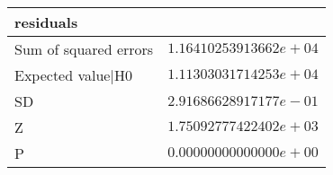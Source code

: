 \begin{table}[!tbp]
\begin{center}
\begin{tabular}{lr}
\hline\hline
\multicolumn{1}{l}{residuals}&\multicolumn{1}{c}{}\tabularnewline
\hline
Sum of squared errors&$1.16410253913662e+04$\tabularnewline
Expected value|H0&$1.11303031714253e+04$\tabularnewline
SD&$2.91686628917177e-01$\tabularnewline
Z&$1.75092777422402e+03$\tabularnewline
P&$0.00000000000000e+00$\tabularnewline
\hline
\end{tabular}\end{center}

\end{table}
